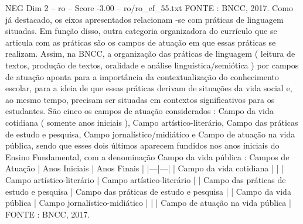 \begin{textsample}{NEG Dim 2 – ro – Score -3.00 – ro/ro\_ef\_55.txt}
FONTE : BNCC, 2017.
Como já destacado, os eixos apresentados relacionam -se com práticas de linguagem situadas.
Em função disso, outra categoria organizadora do currículo que se articula com as práticas são os campos de atuação em que essas práticas se realizam.
Assim, na BNCC, a organização das práticas de linguagem ( leitura de textos, produção de textos, oralidade e análise linguística/semiótica ) por campos de atuação aponta para a importância da contextualização do conhecimento escolar, para a ideia de que essas práticas derivam de situações da vida social e, ao mesmo tempo, precisam ser situadas em contextos significativos para os estudantes.
São cinco os campos de atuação considerados : Campo da vida cotidiana ( somente anos iniciais ), Campo artístico-literário, Campo das práticas de estudo e pesquisa, Campo jornalístico/midiático e Campo de atuação na vida pública, sendo que esses dois últimos aparecem fundidos nos anos iniciais do Ensino Fundamental, com a denominação Campo da vida pública : Campos de Atuação | Anos Iniciais | Anos Finais | |---|---| | Campo da vida cotidiana | | | Campo artístico-literário | Campo artístico-literário | | Campo das práticas de estudo e pesquisa | Campo das práticas de estudo e pesquisa | | Campo da vida pública | Campo jornalístico-midiático | | | Campo de atuação na vida pública | FONTE : BNCC, 2017.

\end{textsample}
